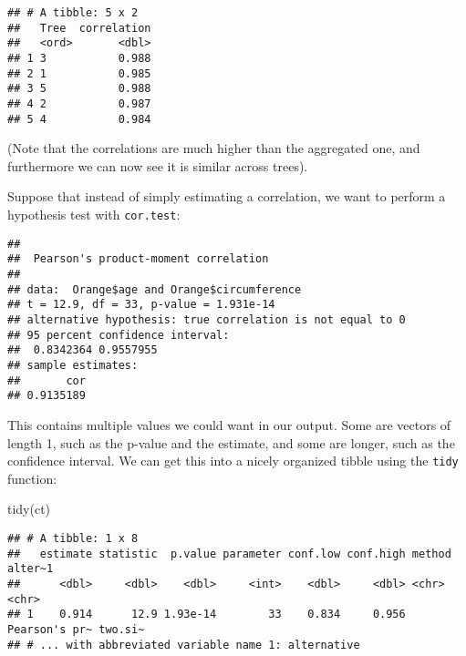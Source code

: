 \documentclass[
]{book}
\newenvironment{Shaded}{\begin{snugshade}}{\end{snugshade}}
\newcommand{\FunctionTok}[1]{\textcolor[rgb]{0.00,0.00,0.00}{#1}}
\newcommand{\NormalTok}[1]{#1}
\newcommand{\OtherTok}[1]{\textcolor[rgb]{0.56,0.35,0.01}{#1}}
\newcommand{\SpecialCharTok}[1]{\textcolor[rgb]{0.00,0.00,0.00}{#1}}
\begin{document}
\begin{verbatim}
## # A tibble: 5 x 2
##   Tree  correlation
##   <ord>       <dbl>
## 1 3           0.988
## 2 1           0.985
## 3 5           0.988
## 4 2           0.987
## 5 4           0.984
\end{verbatim}

(Note that the correlations are much higher than the aggregated one, and furthermore we can now see it is similar across trees).

Suppose that instead of simply estimating a correlation, we want to perform a hypothesis test with \texttt{cor.test}:

\begin{Shaded}
\end{Shaded}

\begin{verbatim}
## 
##  Pearson's product-moment correlation
## 
## data:  Orange$age and Orange$circumference
## t = 12.9, df = 33, p-value = 1.931e-14
## alternative hypothesis: true correlation is not equal to 0
## 95 percent confidence interval:
##  0.8342364 0.9557955
## sample estimates:
##       cor 
## 0.9135189
\end{verbatim}

This contains multiple values we could want in our output. Some are vectors of length 1, such as the p-value and the estimate, and some are longer, such as the confidence interval. We can get this into a nicely organized tibble using the \texttt{tidy} function:

\begin{Shaded}
\begin{Highlighting}[]
\FunctionTok{tidy}\NormalTok{(ct)}
\end{Highlighting}
\end{Shaded}

\begin{verbatim}
## # A tibble: 1 x 8
##   estimate statistic  p.value parameter conf.low conf.high method        alter~1
##      <dbl>     <dbl>    <dbl>     <int>    <dbl>     <dbl> <chr>         <chr>  
## 1    0.914      12.9 1.93e-14        33    0.834     0.956 Pearson's pr~ two.si~
## # ... with abbreviated variable name 1: alternative
\end{verbatim}
\end{document}
